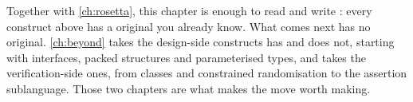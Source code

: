 Together with \cref{ch:rosetta}, this chapter is enough to read and write
\SV{} \RTL{}: every construct above has a \VHDL{} original you already know.
What comes next has no original. \cref{ch:beyond} takes the design-side
constructs \SV{} has and \VHDL{} does not, starting with interfaces, packed
structures and parameterised types, and  takes the
verification-side ones, from classes and constrained randomisation to the
assertion sublanguage. Those two chapters are what makes the move worth
making.
